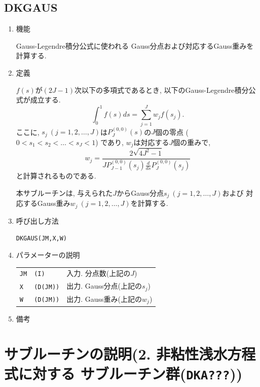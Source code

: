 \documentclass[a4j,fleqn]{jarticle}
\begin{document}
\subsection{DKGAUS}
\begin{enumerate}

\item 機能

Gauss-Legendre積分公式に使われる
Gauss分点および対応するGauss重みを計算する.

\item 定義

$f(s)$が$(2J-1)$次以下の多項式であるとき, 
以下のGauss-Legendre積分公式が成立する.
\[
\int^1_0 f(s)ds=\sum^J_{j=1}w_j f(s_j).
\]
ここに, $s_j\ (j=1,2,\dots,J)$は$P^{(0,0)}_J(s)$の$J$個の零点
($0<s_1<s_2<\dots<s_J<1$)
であり, $w_j$は対応する$J$個の重みで,
\[
w_j=\frac{2\sqrt{4J^2-1}}{JP^{(0,0)}_{J-1}(s_j)\frac{d}{ds}P^{(0,0)}_J(s_j)}
\]
と計算されるものである.

本サブルーチンは, 与えられた$J$からGauss分点$s_j\ (j=1,2,\dots,J)$および
対応するGauss重み$w_j\ (j=1,2,\dots,J)$を計算する.

\item 呼び出し方法

{\tt DKGAUS(JM,X,W)}
  
\item パラメーターの説明

\begin{tabular}{lll}
{\tt JM} & {\tt (I)} & 入力. 分点数(上記の$J$)\\
{\tt X} & {\tt (D(JM))} & 出力. Gauss分点(上記の$s_j$)\\
{\tt W} & {\tt (D(JM))} & 出力. Gauss重み(上記の$w_j$)
\end{tabular}

\item 備考

\end{enumerate}

\section{サブルーチンの説明(2. 非粘性浅水方程式に対する
サブルーチン群({\tt DKA???}))}
\end{document}

